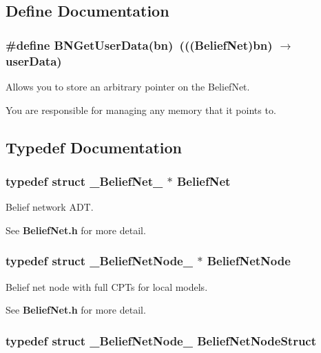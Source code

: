 \subsection{Define Documentation}
\subsubsection{\setlength{\rightskip}{0pt plus 5cm}\#define BNGet\-User\-Data(bn)\ ((({\bf Belief\-Net})bn) $\rightarrow$ user\-Data)}\label{BeliefNet_8h_a1}


Allows you to store an arbitrary pointer on the Belief\-Net. 

You are responsible for managing any memory that it points to. 

\subsection{Typedef Documentation}
\subsubsection{\setlength{\rightskip}{0pt plus 5cm}typedef struct {\bf \_\-Belief\-Net\_\-} $\ast$ {\bf Belief\-Net}}\label{BeliefNet_8h_a5}


Belief network ADT. 

See {\bf Belief\-Net.h} for more detail. 
\subsubsection{\setlength{\rightskip}{0pt plus 5cm}typedef struct {\bf \_\-Belief\-Net\-Node\_\-} $\ast$ {\bf Belief\-Net\-Node}}\label{BeliefNet_8h_a3}


Belief net node with full CPTs for local models. 

See {\bf Belief\-Net.h} for more detail. 
\subsubsection{\setlength{\rightskip}{0pt plus 5cm}typedef struct {\bf \_\-Belief\-Net\-Node\_\-}  {\bf Belief\-Net\-Node\-Struct}}\label{BeliefNet_8h_a2}


